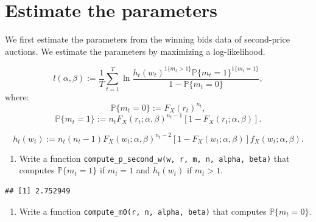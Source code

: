 \documentclass[]{book}
\newenvironment{Shaded}{\begin{snugshade}}{\end{snugshade}}
\newcommand{\KeywordTok}[1]{\textcolor[rgb]{0.13,0.29,0.53}{\textbf{#1}}}
\newcommand{\DecValTok}[1]{\textcolor[rgb]{0.00,0.00,0.81}{#1}}
\newcommand{\StringTok}[1]{\textcolor[rgb]{0.31,0.60,0.02}{#1}}
\newcommand{\CommentTok}[1]{\textcolor[rgb]{0.56,0.35,0.01}{\textit{#1}}}
\newcommand{\OperatorTok}[1]{\textcolor[rgb]{0.81,0.36,0.00}{\textbf{#1}}}
\newcommand{\NormalTok}[1]{#1}
\providecommand{\tightlist}{%
  \setlength{\itemsep}{0pt}\setlength{\parskip}{0pt}}
\begin{document}
\section{Estimate the parameters}\label{estimate-the-parameters-5}

We first estimate the parameters from the winning bids data of
second-price auctions. We estimate the parameters by maximizing a
log-likelihood.

\[
l(\alpha, \beta) := \frac{1}{T} \sum_{t = 1}^T \ln\frac{h_t(w_t)^{1\{m_t > 1\}} \mathbb{P}\{m_t = 1\}^{1\{m_t = 1\}} }{1 - \mathbb{P}\{m_t = 0\}},
\] where: \[
\mathbb{P}\{m_t = 0\} := F_X(r_t)^{n_t},
\] \[
\mathbb{P}\{m_t = 1\} := n_t F_X(r_t; \alpha, \beta)^{n_t - 1} [1 - F_X(r_t; \alpha, \beta)].
\]

\[
h_t(w_t) := n_t (n_t - 1) F_X(w_t; \alpha, \beta)^{n_t - 2} [1 - F_X(w_t; \alpha, \beta)] f_X(w_t; \alpha, \beta).
\]

\begin{enumerate}
\def\labelenumi{\arabic{enumi}.}
\tightlist
\item
  Write a function
  \texttt{compute\_p\_second\_w(w,\ r,\ m,\ n,\ alpha,\ beta)} that
  computes \(\mathbb{P}\{m_t = 1\}\) if \(m_t = 1\) and \(h_t(w_t)\) if
  \(m_t > 1\).
\end{enumerate}

\begin{Shaded}
\end{Shaded}

\begin{verbatim}
## [1] 2.752949
\end{verbatim}

\begin{enumerate}
\def\labelenumi{\arabic{enumi}.}
\setcounter{enumi}{1}
\tightlist
\item
  Write a function \texttt{compute\_m0(r,\ n,\ alpha,\ beta)} that
  computes \(\mathbb{P}\{m_t = 0\}\).
\end{enumerate}
\end{document}
